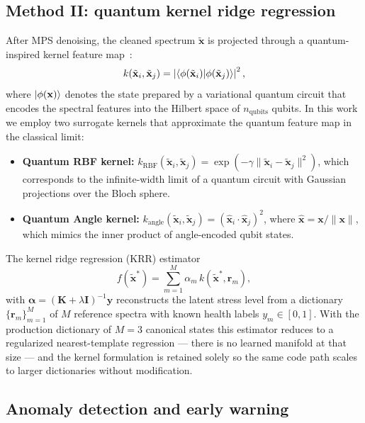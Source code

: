 \documentclass[11pt,a4paper]{article}
\begin{document}
\subsection{Method II: quantum kernel ridge regression}

After MPS denoising, the cleaned spectrum $\tilde{\mathbf{x}}$ is projected through a quantum-inspired kernel feature map~\cite{Havlicek2019}:
\begin{equation}\label{eq:SI_quantum_kernel}
k(\tilde{\mathbf{x}}_i, \tilde{\mathbf{x}}_j) = \left| \braket{\phi(\tilde{\mathbf{x}}_i)}{\phi(\tilde{\mathbf{x}}_j)} \right|^2,
\end{equation}
where $\ket{\phi(\mathbf{x})}$ denotes the state prepared by a variational quantum circuit that encodes the spectral features into the Hilbert space of $n_{\mathrm{qubits}}$ qubits. In this work we employ two surrogate kernels that approximate the quantum feature map in the classical limit:
\begin{itemize}
\item \textbf{Quantum RBF kernel:} $k_{\mathrm{RBF}}(\tilde{\mathbf{x}}_i, \tilde{\mathbf{x}}_j) = \exp(-\gamma \|\tilde{\mathbf{x}}_i - \tilde{\mathbf{x}}_j\|^2)$, which corresponds to the infinite-width limit of a quantum circuit with Gaussian projections over the Bloch sphere.
\item \textbf{Quantum Angle kernel:} $k_{\mathrm{angle}}(\tilde{\mathbf{x}}_i, \tilde{\mathbf{x}}_j) = (\hat{\mathbf{x}}_i \cdot \hat{\mathbf{x}}_j)^2$, where $\hat{\mathbf{x}} = \mathbf{x} / \|\mathbf{x}\|$, which mimics the inner product of angle-encoded qubit states.
\end{itemize}
The kernel ridge regression (KRR) estimator
\begin{equation}\label{eq:SI_krr}
f(\tilde{\mathbf{x}}^*) = \sum_{m=1}^{M} \alpha_m\, k(\tilde{\mathbf{x}}^*, \mathbf{r}_m),
\end{equation}
with $\boldsymbol{\alpha} = (\mathbf{K} + \lambda \mathbf{I})^{-1} \mathbf{y}$ reconstructs the latent stress level from a dictionary $\{\mathbf{r}_m\}_{m=1}^M$ of $M$ reference spectra with known health labels $y_m \in [0, 1]$. With the production dictionary of $M = 3$ canonical states this estimator reduces to a regularized nearest-template regression --- there is no learned manifold at that size --- and the kernel formulation is retained solely so the same code path scales to larger dictionaries without modification.

\subsection{Anomaly detection and early warning}
\end{document}
